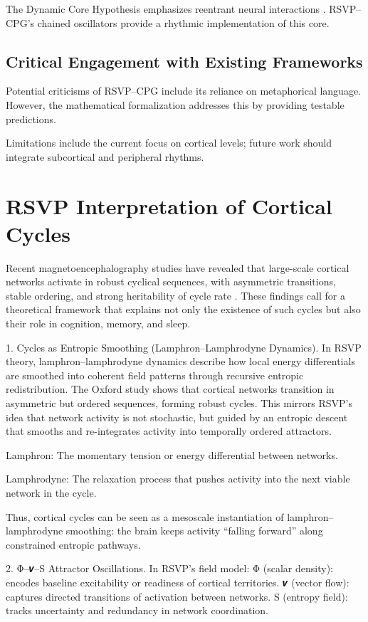 \documentclass{article}
\begin{document}
The Dynamic Core Hypothesis emphasizes reentrant neural interactions \citep{tononi1998consciousness}. RSVP--CPG's chained oscillators provide a rhythmic implementation of this core.

\subsection{Critical Engagement with Existing Frameworks}

Potential criticisms of RSVP--CPG include its reliance on metaphorical language. However, the mathematical formalization addresses this by providing testable predictions.

Limitations include the current focus on cortical levels; future work should integrate subcortical and peripheral rhythms.

\section{RSVP Interpretation of Cortical Cycles}

Recent magnetoencephalography studies have revealed that large-scale cortical networks activate in robust cyclical sequences, with asymmetric transitions, stable ordering, and strong heritability of cycle rate \citep{van2025cortical}. These findings call for a theoretical framework that explains not only the existence of such cycles but also their role in cognition, memory, and sleep.

1. Cycles as Entropic Smoothing (Lamphron–Lamphrodyne Dynamics). In RSVP theory, lamphron–lamphrodyne dynamics describe how local energy differentials are smoothed into coherent field patterns through recursive entropic redistribution. The Oxford study shows that cortical networks transition in asymmetric but ordered sequences, forming robust cycles. This mirrors RSVP’s idea that network activity is not stochastic, but guided by an entropic descent that smooths and re-integrates activity into temporally ordered attractors.

Lamphron: The momentary tension or energy differential between networks.

Lamphrodyne: The relaxation process that pushes activity into the next viable network in the cycle.

Thus, cortical cycles can be seen as a mesoscale instantiation of lamphron–lamphrodyne smoothing: the brain keeps activity “falling forward” along constrained entropic pathways.

2. Φ–𝒗–S Attractor Oscillations. In RSVP’s field model: Φ (scalar density): encodes baseline excitability or readiness of cortical territories. 𝒗 (vector flow): captures directed transitions of activation between networks. S (entropy field): tracks uncertainty and redundancy in network coordination.
\end{document}
